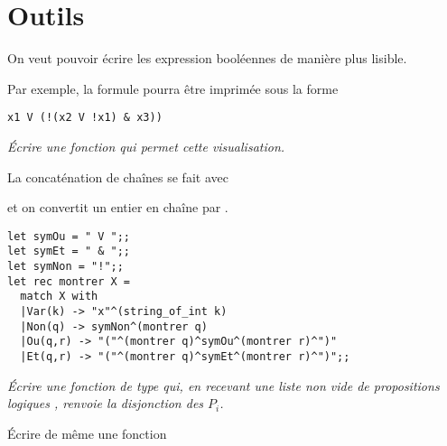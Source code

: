 \section{Outils}
On veut pouvoir écrire les expression booléennes de manière plus lisible. 

Par exemple, la formule  pourra être imprimée sous la forme
\begin{lstlisting}
x1 V (!(x2 V !x1) & x3))
\end{lstlisting}
\begin{Exercise}\it 
Écrire une fonction  qui permet cette visualisation.

La concaténation de chaînes se fait avec  

et on convertit un entier en chaîne par .
\end{Exercise}
\begin{Answer}
\begin{lstlisting}
let symOu = " V ";; 
let symEt = " & ";; 
let symNon = "!";;
let rec montrer X =
  match X with
  |Var(k) -> "x"^(string_of_int k)
  |Non(q) -> symNon^(montrer q)
  |Ou(q,r) -> "("^(montrer q)^symOu^(montrer r)^")"
  |Et(q,r) -> "("^(montrer q)^symEt^(montrer r)^")";;
\end{lstlisting}
\end{Answer}
\begin{Exercise}\it
Écrire une fonction  de type  qui, en recevant une liste non vide de propositions logiques \type{[P1; P2; ...; Pn]}, renvoie la disjonction des $P_i$.

Écrire de même une fonction 
\end{Exercise}

